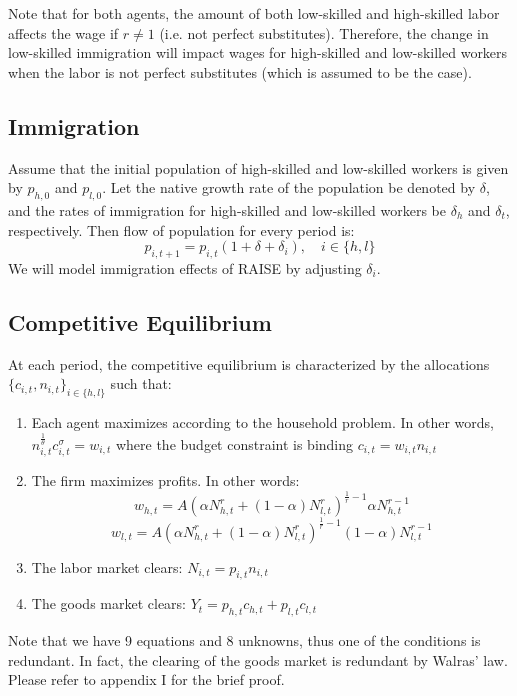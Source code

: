 \documentclass[11pt]{article}
\begin{document}
  Note that for both agents, the amount of both low-skilled and high-skilled labor affects the wage if $r\neq 1$ (i.e. not perfect substitutes). Therefore, the change in low-skilled immigration will impact wages for high-skilled and low-skilled workers when the labor is not perfect substitutes (which is assumed to be the case).

  \subsection{Immigration}
  Assume that the initial population of high-skilled and low-skilled workers is given by $p_{h,0}$ and $p_{l,0}$. Let the native growth rate of the population be denoted by $\delta$, and the rates of immigration for high-skilled and low-skilled workers be $\delta_h$ and $\delta_t$, respectively. Then flow of population for every period is:
  $$p_{i,t+1} = p_{i,t}(1+\delta+\delta_i), \quad i\in\{h,l\}$$
  We will model immigration effects of RAISE by adjusting $\delta_i$.

  \subsection{Competitive Equilibrium}
  At each period, the competitive equilibrium is characterized by the allocations $\{c_{i,t}, n_{i,t}\}_{i\in\{h, l\}}$ such that:
  \begin{enumerate}
    \item Each agent maximizes according to the household problem. In other words, $ n_{i,t}^{\frac{1}{\theta}} c_{i,t}^\sigma= w_{i,t}$ where the budget constraint is binding $c_{i,t}=w_{i,t} n_{i,t}$
    \item The firm maximizes profits. In other words:
    $$w_{h,t} = A(\alpha N_{h,t}^r + (1-\alpha) N_{l,t}^r )^{\frac{1}{r}-1} \alpha N_{h,t}^{r-1} $$
    $$w_{l,t} = A(\alpha N_{h,t}^r + (1-\alpha) N_{l,t}^r )^{\frac{1}{r}-1} (1-\alpha) N_{l,t}^{r-1} $$
    \item The labor market clears: $N_{i,t} = p_{i,t} n_{i,t}$
    \item The goods market clears: $Y_t = p_{h,t} c_{h,t}+ p_{l,t} c_{l,t}$
  \end{enumerate}
  Note that we have 9 equations and 8 unknowns, thus one of the conditions is redundant. In fact, the clearing of the goods market is redundant by Walras' law. Please refer to appendix I for the brief proof.
\end{document}
